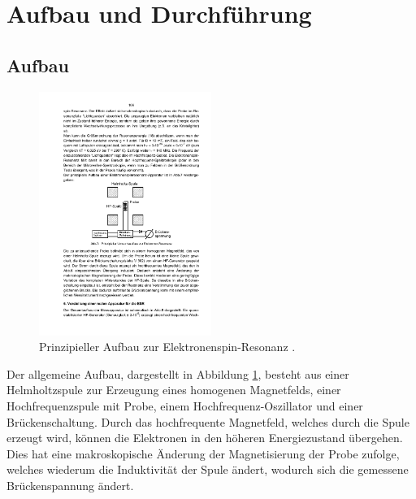 \section {Aufbau und Durchführung}
\label{sec:durchführung}

\subsection{Aufbau}
\begin{figure}
	\centering
  \includegraphics[width=0.5\textwidth] {bilder/aufbau1.pdf}
	\caption{Prinzipieller Aufbau zur Elektronenspin-Resonanz \cite{anleitung28}.}
	\label{fig:aufbau1}
\end{figure}

Der allgemeine Aufbau, dargestellt in Abbildung \ref{fig:aufbau1}, besteht aus einer Helmholtzspule zur Erzeugung eines homogenen Magnetfelds, einer Hochfrequenzspule mit Probe, einem Hochfrequenz-Oszillator und einer Brückenschaltung. Durch das hochfrequente Magnetfeld, welches durch die Spule erzeugt wird, können die Elektronen in den höheren Energiezustand übergehen. Dies hat eine makroskopische Änderung der Magnetisierung der Probe zufolge, welches wiederum die Induktivität der Spule ändert, wodurch sich die gemessene Brückenspannung ändert.

